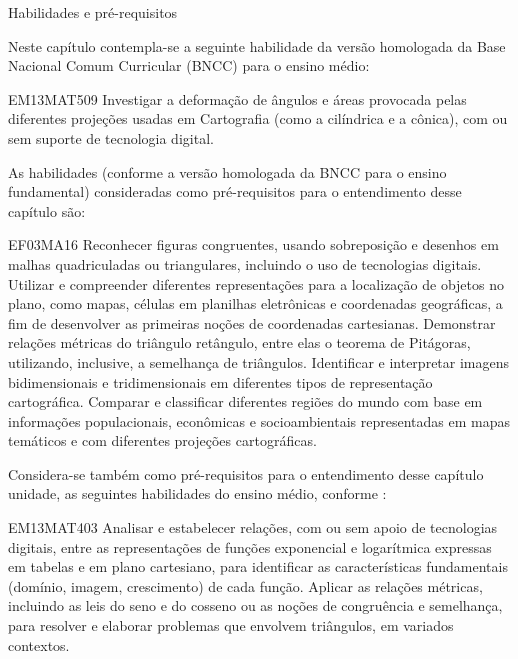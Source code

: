 \begin{apresentacao}{Habilidades e pré-requisitos}
{

Neste capítulo contempla-se a seguinte habilidade da versão homologada da Base Nacional Comum Curricular (BNCC) \citep{BNCC2018} para o ensino médio:

\begin{habilities}{EM13MAT509}
Investigar a deformação de ângulos e áreas provocada pelas diferentes projeções usadas em Cartografia (como a cilíndrica e a cônica), com ou sem suporte de tecnologia digital.
\end{habilities}

 
As habilidades (conforme a versão homologada da BNCC para o ensino fundamental) consideradas como pré-requisitos para o entendimento desse capítulo são:

\begin{habilities}{EF03MA16}
Reconhecer figuras congruentes, usando sobreposição e desenhos em malhas quadriculadas ou triangulares, incluindo o uso de tecnologias digitais.
 Utilizar e compreender diferentes representações para a localização de objetos no plano, como mapas, células em planilhas eletrônicas e coordenadas geográficas, a fim de desenvolver as primeiras noções de coordenadas cartesianas.
 Demonstrar relações métricas do triângulo retângulo, entre elas o teorema de Pitágoras, utilizando, inclusive, a semelhança de triângulos.
Identificar e interpretar imagens bidimensionais e tridimensionais em diferentes tipos de representação cartográfica.
Comparar e classificar diferentes regiões do mundo com base em informações populacionais, econômicas e socioambientais representadas em mapas temáticos e com diferentes projeções cartográficas.
\end{habilities}


Considera-se também como pré-requisitos para o entendimento desse capítulo unidade, as seguintes habilidades do ensino médio, conforme \cite{BNCC2018}:
\begin{habilities}{EM13MAT403}
Analisar e estabelecer relações, com ou sem apoio de tecnologias digitais, entre as representações de funções exponencial e logarítmica expressas em tabelas e em plano cartesiano, para identificar as características fundamentais (domínio, imagem, crescimento) de cada função.
 Aplicar as relações métricas, incluindo as leis do seno e do cosseno ou as noções de congruência e semelhança, para resolver e elaborar problemas que envolvem triângulos, em variados contextos.
\end{habilities}

}
\end{apresentacao}

